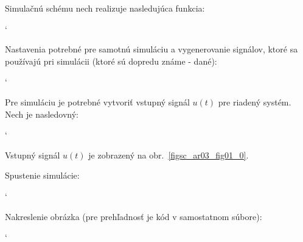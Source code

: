 \documentclass[a4paper, 10pt, ]{article}
\begin{document}
\noindent
Simulačnú schému nech realizuje nasledujúca funkcia:

{\catcode`

}


\noindent
Nastavenia potrebné pre samotnú simuláciu a vygenerovanie signálov, ktoré sa používajú pri simulácii (ktoré sú dopredu známe - dané):

{\catcode`

}

\noindent
Pre simuláciu je potrebné vytvoriť vstupný signál $u(t)$ pre riadený systém. Nech je nasledovný:


{\catcode`

}

\noindent
Vstupný signál $u(t)$ je zobrazený na obr.~\ref{figsc_ar03_fig01_0}.

\medskip

\noindent
Spustenie simulácie:


{\catcode`

}



\noindent
Nakreslenie obrázka (pre prehľadnosť je kód v samostatnom súbore):


{\catcode`

}


\begin{centering}


    \vspace{-2mm}

    \figcaption{}

    \vspace{2mm}

    \label{figsc_ar03_fig01_0}

\end{centering}
\end{document}
